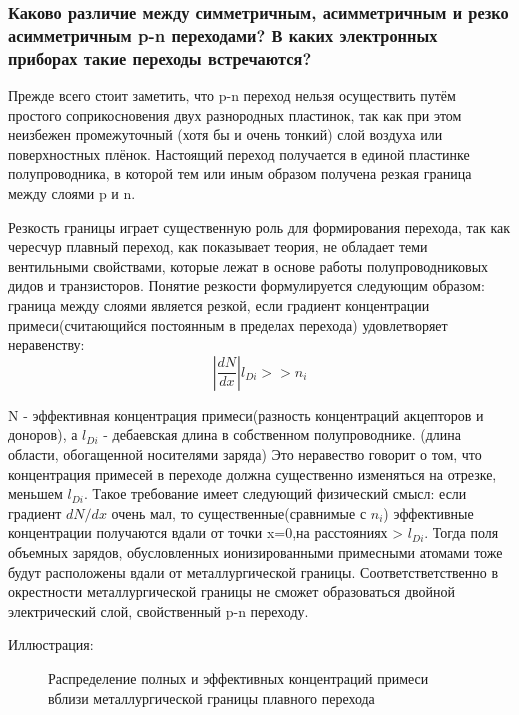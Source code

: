 \subsubsection{Каково различие между симметричным, асимметричным и резко асимметричным p-n переходами? В каких электронных приборах такие переходы встречаются?}

Прежде всего стоит заметить, что p-n переход нельзя осуществить путём простого соприкосновения двух разнородных пластинок, так как при этом неизбежен промежуточный (хотя бы и очень тонкий) слой воздуха или поверхностных плёнок. Настоящий переход получается в единой пластинке полупроводника, в которой тем или иным образом получена резкая граница между слоями p и n.

Резкость границы играет существенную роль для формирования перехода, так как чересчур плавный переход, как показывает теория, не обладает теми вентильными свойствами, которые лежат в основе работы полупроводниковых дидов и транзисторов. Понятие резкости формулируется следующим образом: граница между слоями является резкой, если градиент концентрации примеси(считающийся постоянным в пределах перехода) удовлетворяет неравенству:
\begin{equation}
\left|\frac{dN}{dx}\right|l_{Di} >> n_i
\label{condition}
\end{equation}

N - эффективная концентрация примеси(разность концентраций акцепторов и доноров), а $l_{Di}$ - дебаевская длина в собственном полупроводнике. (длина области, обогащенной носителями заряда)
Это неравество говорит о том, что концентрация примесей в переходе должна существенно изменяться на отрезке, меньшем $l_{Di}$. Такое требование имеет следующий физический смысл: если градиент $dN/dx$ очень мал, то существенные(сравнимые с $n_i$) эффективные концентрации получаются вдали от точки x=0,на расстояниях > $l_{Di}$. Тогда поля объемных зарядов, обусловленных ионизированными примесными атомами тоже будут расположены вдали от металлургической границы. Соответстветственно в окрестности металлургической границы не сможет образоваться двойной электрический слой, свойственный p-n переходу.
\pagebreak

Иллюстрация:
\begin{center}
	\begin{figure}[h!]
		\caption{Распределение полных и эффективных концентраций примеси вблизи металлургической границы плавного перехода}
	\end{figure}
\end{center}

